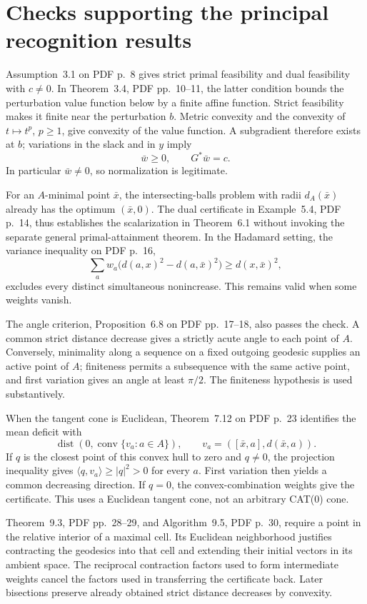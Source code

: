 \documentclass[10pt]{article}
\begin{document}
\section*{Checks supporting the principal recognition results}
Assumption 3.1 on PDF p. 8 gives strict primal feasibility and dual feasibility with \(c\ne0\). In Theorem 3.4, PDF pp. 10–11, the latter condition bounds the perturbation value function below by a finite affine function. Strict feasibility makes it finite near the perturbation \(b\). Metric convexity and the convexity of \(t\mapsto t^p\), \(p\ge1\), give convexity of the value function. A subgradient therefore exists at \(b\); variations in the slack and in \(y\) imply \[\bar w\ge0,\qquad G^*\bar w=c.\] In particular \(\bar w\ne0\), so normalization is legitimate.\par
For an \(A\)-minimal point \(\bar x\), the intersecting-balls problem with radii \(d_A(\bar x)\) already has the optimum \((\bar x,0)\). The dual certificate in Example 5.4, PDF p. 14, thus establishes the scalarization in Theorem 6.1 without invoking the separate general primal-attainment theorem. In the Hadamard setting, the variance inequality on PDF p. 16, \[\sum_a w_a\bigl(d(a,x)^2-d(a,\bar x)^2\bigr)
 \ge d(x,\bar x)^2,\] excludes every distinct simultaneous nonincrease. This remains valid when some weights vanish.\par
The angle criterion, Proposition 6.8 on PDF pp. 17–18, also passes the check. A common strict distance decrease gives a strictly acute angle to each point of \(A\). Conversely, minimality along a sequence on a fixed outgoing geodesic supplies an active point of \(A\); finiteness permits a subsequence with the same active point, and first variation gives an angle at least \(\pi/2\). The finiteness hypothesis is used substantively.\par
When the tangent cone is Euclidean, Theorem 7.12 on PDF p. 23 identifies the mean deficit with \[\operatorname{dist}\left(0,\operatorname{conv}\{v_a:a\in A\}\right),
 \qquad v_a=([\bar x,a],d(\bar x,a)).\] If \(q\) is the closest point of this convex hull to zero and \(q\ne0\), the projection inequality gives \(\langle q,v_a\rangle\ge |q|^2>0\) for every \(a\). First variation then yields a common decreasing direction. If \(q=0\), the convex-combination weights give the certificate. This uses a Euclidean tangent cone, not an arbitrary CAT(0) cone.\par
Theorem 9.3, PDF pp. 28–29, and Algorithm 9.5, PDF p. 30, require a point in the relative interior of a maximal cell. Its Euclidean neighborhood justifies contracting the geodesics into that cell and extending their initial vectors in its ambient space. The reciprocal contraction factors used to form intermediate weights cancel the factors used in transferring the certificate back. Later bisections preserve already obtained strict distance decreases by convexity.\par
\end{document}
